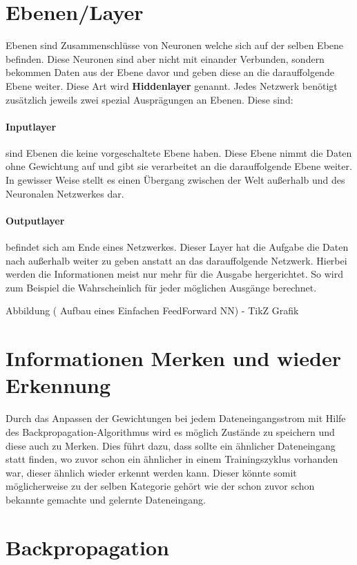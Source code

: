 \section{Ebenen/Layer}

Ebenen sind Zusammenschlüsse von Neuronen welche sich auf der selben Ebene befinden. 
Diese Neuronen sind aber nicht mit einander Verbunden, sondern bekommen Daten aus der Ebene davor und geben diese an die darauffolgende Ebene weiter. 
Diese Art wird \textbf{Hiddenlayer} genannt. 
Jedes Netzwerk benötigt zusätzlich jeweils zwei spezial Ausprägungen an Ebenen. 
Diese sind:

\paragraph{Inputlayer} sind Ebenen die keine vorgeschaltete Ebene haben. 
Diese Ebene nimmt die Daten ohne Gewichtung auf und gibt sie verarbeitet an die darauffolgende Ebene weiter. 
In gewisser Weise stellt es einen Übergang zwischen der Welt außerhalb und des Neuronalen Netzwerkes dar.

\paragraph{Outputlayer} befindet sich am Ende eines Netzwerkes. 
Dieser Layer hat die Aufgabe die Daten nach außerhalb weiter zu geben anstatt an das darauffolgende Netzwerk. 
Hierbei werden die Informationen meist nur mehr für die Ausgabe hergerichtet. 
So wird zum Beispiel die Wahrscheinlich für jeder möglichen Ausgänge berechnet.

Abbildung ( Aufbau eines Einfachen FeedForward NN) - TikZ Grafik

\section{Informationen Merken und wieder Erkennung}

Durch das Anpassen der Gewichtungen bei jedem Dateneingangsstrom mit Hilfe des Backpropagation-Algorithmus wird es möglich Zustände zu speichern und diese auch zu Merken. 
Dies führt dazu, dass sollte ein ähnlicher Dateneingang statt finden, wo zuvor schon ein ähnlicher in einem Trainingszyklus vorhanden war, dieser ähnlich wieder erkennt werden kann. 
Dieser könnte somit möglicherweise zu der selben Kategorie gehört wie der schon zuvor schon bekannte gemachte und gelernte Dateneingang.

\section{Backpropagation}

